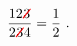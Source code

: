 \documentclass{standalone}
\newcommand{\cancel}[1]{%
	\tikz[baseline=(tocancel.base)]{
		\node[inner sep=0pt,outer sep=0pt] (tocancel) {#1};
		\draw[red,thick,line cap=round] (tocancel.south west) -- (tocancel.north east);
	}%
}%
\begin{document}
  $\displaystyle\frac{12\cancel{3}}{2\cancel{3}4}=\frac{1}{2}~.$
\end{document}
